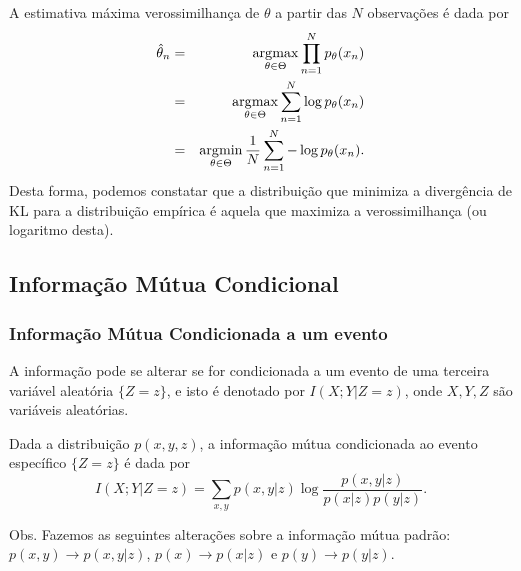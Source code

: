 \begin{frame}[allowframebreaks]
  \framebreak

  A estimativa máxima verossimilhança de $\theta$ a partir das $N$ observações é dada por
  \begin{eqnarray}
  \hat{\theta}_n &=& \operatorname*{\arg\!\max}_{\theta \in \Theta} \prod_{n=1}^{N} p_\theta(x_n) \nonumber \\
	    &=& \operatorname*{\arg\!\max}_{\theta \in \Theta} \sum_{n=1}^{N} \log p_\theta(x_n) \nonumber \\
        &=& \operatorname*{\arg\!\min}_{\theta \in \Theta} \frac{1}{N} \sum_{n=1}^{N} - \log p_\theta(x_n) .
  \end{eqnarray}
   Desta forma, podemos constatar que a distribuição que minimiza a divergência de KL para a distribuição empírica é
   aquela que maximiza a verossimilhança (ou logaritmo desta).
  

\end{frame}


\subsection{Informação Mútua Condicional}
\begin{frame}%
  \frametitle{Informação Mútua Condicionada a um evento}
  A informação pode se alterar se for condicionada a um evento de uma terceira variável
  aleatória $\{Z=z\}$, e isto é denotado por $I(X;Y|Z=z)$, onde $X,Y,Z$ são variáveis
  aleatórias.

  Dada a distribuição $p(x,y,z)$, a informação mútua condicionada ao evento específico
  $\{Z=z\}$ é dada por
  \begin{equation}
  I(X;Y|Z=z) = \sum_{x,y} p(x,y|z) \log \frac{p(x,y|z)}{p(x|z)p(y|z)} .
  \end{equation}

  Obs. Fazemos as seguintes alterações sobre a informação mútua padrão: 
  $p(x,y)\rightarrow p(x,y|z)$, $p(x)\rightarrow p(x|z)$ e $p(y) \rightarrow p(y|z)$.
\end{frame}

